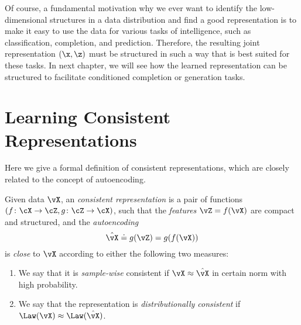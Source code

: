 \documentclass[../../book-main.tex]{subfiles}
\begin{document}
Of course, a fundamental motivation why we ever want to identify the
low-dimensional structures in a data distribution and find a good
representation is to make it easy to use the data for various tasks
of intelligence, such as classification, completion, and prediction.
Therefore, the resulting joint representation $(\x, \z)$ must be
structured in such a way that is best suited for these tasks. In
next chapter, we will
see how the learned representation can be structured to facilitate
conditioned completion or generation tasks.

\section{Learning Consistent Representations}\label{sec:consistent-representation}

Here we give a formal definition of consistent representations, which
are closely related to the concept of autoencoding. %
\begin{definition}\label{def:bidirectional_rep}
  Given data \(\vX\), an \textit{consistent representation} is a pair
  of functions \((f \colon \cX \to \cZ, g \colon \cZ \to \cX)\), such
  that the \textit{features} \(\vZ = f(\vX)\) are compact and
  structured, and the \textit{autoencoding} 
  \begin{equation}
    \hat{\vX} \doteq g(\vZ) = g(f(\vX))
  \end{equation}
  is \textit{close} to \(\vX\) according to either the
  following two measures:
  \begin{enumerate}
    \item We say that it is \textit{sample-wise} consistent if \(\vX
      \approx \hat{\vX}\) in certain norm with high probability.
    \item We say that the representation is \textit{distributionally
      consistent} if \(\Law(\vX) \approx \Law(\hat{\vX})\).
  \end{enumerate}
\end{definition}
\end{document}
